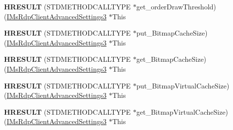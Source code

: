 \begin{DoxyCompactItemize}
\item 
\mbox{\label{struct_m_s_t_s_c_lib_1_1_i_ms_rdp_client_advanced_settings3_vtbl_a4f5bf6e7bf132165fd111712d96d382a}} 
{\bfseries H\+R\+E\+S\+U\+LT} (S\+T\+D\+M\+E\+T\+H\+O\+D\+C\+A\+L\+L\+T\+Y\+PE $\ast$get\+\_\+order\+Draw\+Threshold)(\hyperlink{interface_m_s_t_s_c_lib_1_1_i_ms_rdp_client_advanced_settings3}{I\+Ms\+Rdp\+Client\+Advanced\+Settings3} $\ast$This
\item 
\mbox{\label{struct_m_s_t_s_c_lib_1_1_i_ms_rdp_client_advanced_settings3_vtbl_a65f248ac7fcdb32cd425a055bbbf8766}} 
{\bfseries H\+R\+E\+S\+U\+LT} (S\+T\+D\+M\+E\+T\+H\+O\+D\+C\+A\+L\+L\+T\+Y\+PE $\ast$put\+\_\+\+Bitmap\+Cache\+Size)(\hyperlink{interface_m_s_t_s_c_lib_1_1_i_ms_rdp_client_advanced_settings3}{I\+Ms\+Rdp\+Client\+Advanced\+Settings3} $\ast$This
\item 
\mbox{\label{struct_m_s_t_s_c_lib_1_1_i_ms_rdp_client_advanced_settings3_vtbl_a53100004d89b2292cfdca08e233526c9}} 
{\bfseries H\+R\+E\+S\+U\+LT} (S\+T\+D\+M\+E\+T\+H\+O\+D\+C\+A\+L\+L\+T\+Y\+PE $\ast$get\+\_\+\+Bitmap\+Cache\+Size)(\hyperlink{interface_m_s_t_s_c_lib_1_1_i_ms_rdp_client_advanced_settings3}{I\+Ms\+Rdp\+Client\+Advanced\+Settings3} $\ast$This
\item 
\mbox{\label{struct_m_s_t_s_c_lib_1_1_i_ms_rdp_client_advanced_settings3_vtbl_a4973639f80d52c4b8fc1fabfee38d4d2}} 
{\bfseries H\+R\+E\+S\+U\+LT} (S\+T\+D\+M\+E\+T\+H\+O\+D\+C\+A\+L\+L\+T\+Y\+PE $\ast$put\+\_\+\+Bitmap\+Virtual\+Cache\+Size)(\hyperlink{interface_m_s_t_s_c_lib_1_1_i_ms_rdp_client_advanced_settings3}{I\+Ms\+Rdp\+Client\+Advanced\+Settings3} $\ast$This
\item 
\mbox{\label{struct_m_s_t_s_c_lib_1_1_i_ms_rdp_client_advanced_settings3_vtbl_a83132d9be7626f4f0c09308207aa59d0}} 
{\bfseries H\+R\+E\+S\+U\+LT} (S\+T\+D\+M\+E\+T\+H\+O\+D\+C\+A\+L\+L\+T\+Y\+PE $\ast$get\+\_\+\+Bitmap\+Virtual\+Cache\+Size)(\hyperlink{interface_m_s_t_s_c_lib_1_1_i_ms_rdp_client_advanced_settings3}{I\+Ms\+Rdp\+Client\+Advanced\+Settings3} $\ast$This

\end{DoxyCompactItemize}
